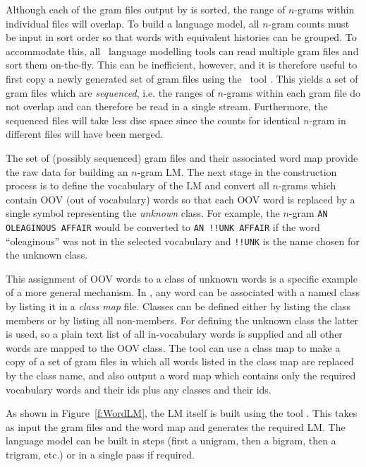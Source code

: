 Although each of the gram files output by  is sorted,
the range of $n$-grams within individual files will overlap.  To build
a language model, all $n$-gram counts must be input in sort order so
that words with equivalent histories can be grouped. To accommodate
this, all \HTK\ language modelling tools can read multiple gram files
and sort them on-the-fly.  This can be inefficient, however, and it is
therefore useful to first copy a newly generated set of gram files
using the \HLM\ tool .  This yields a set of gram files
which are \textit{sequenced}, i.e. the ranges of $n$-grams within each
gram file do not overlap and can therefore be read in a single stream.
Furthermore, the sequenced files will take less disc space since the
counts for identical $n$-gram in different files will have been
merged.


The set of (possibly sequenced) gram files and their associated word
map provide the raw data for building an $n$-gram LM.  The next stage
in the construction process is to define the vocabulary of the LM and
convert all $n$-grams which contain OOV (out of vocabulary) words so
that each OOV word is replaced by a single symbol representing the
\textit{unknown} class.  For example, the $n$-gram \texttt{AN OLEAGINOUS
AFFAIR} would be converted to \texttt{AN !!UNK AFFAIR} if the word
``oleaginous'' was not in the selected vocabulary and \texttt{!!UNK}
is the name chosen for the unknown class.

This assignment of OOV words to a class of unknown words is a specific
example of a more general mechanism.  In \HTK, any word can be
associated with a named class by listing it in a \textit{class map}
file.  Classes can be defined either by listing the class members or
by listing all non-members.  For defining the unknown class the latter
is used, so a plain text list of all in-vocabulary words is supplied
and all other words are mapped to the OOV class.  The tool
 can use a class map to make a copy of a set of gram
files in which all words listed in the class map are replaced by the
class name, and also output a word map which contains only the
required vocabulary words and their ids plus any classes and their
ids.

As shown in Figure~\ref{f:WordLM}, the LM itself is built using the
tool .  This takes as input the gram files and the word
map and generates the required LM.  The language model
can be built in steps (first a unigram, then a bigram, then a trigram,
etc.) or in a single pass if required.


